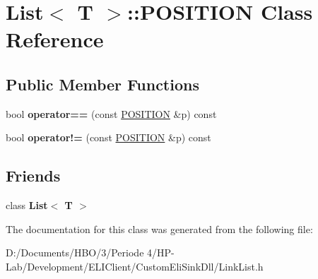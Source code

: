 \hypertarget{class_list_1_1_p_o_s_i_t_i_o_n}{}\section{List$<$ T $>$\+:\+:P\+O\+S\+I\+T\+I\+ON Class Reference}
\label{class_list_1_1_p_o_s_i_t_i_o_n}
\subsection*{Public Member Functions}
\begin{DoxyCompactItemize}
\item 
\mbox{\label{class_list_1_1_p_o_s_i_t_i_o_n_ae608807944df946755eddd1c80a6239b}} 
bool {\bfseries operator==} (const \hyperlink{class_list_1_1_p_o_s_i_t_i_o_n}{P\+O\+S\+I\+T\+I\+ON} \&p) const
\item 
\mbox{\label{class_list_1_1_p_o_s_i_t_i_o_n_a6264eecd231ffe36d8289bcc891cbc15}} 
bool {\bfseries operator!=} (const \hyperlink{class_list_1_1_p_o_s_i_t_i_o_n}{P\+O\+S\+I\+T\+I\+ON} \&p) const
\end{DoxyCompactItemize}
\subsection*{Friends}
\begin{DoxyCompactItemize}
\item 
\mbox{\label{class_list_1_1_p_o_s_i_t_i_o_n_adfa51a0eca1eba953f68ca3f65cdaa05}} 
class {\bfseries List$<$ T $>$}
\end{DoxyCompactItemize}


The documentation for this class was generated from the following file\+:\begin{DoxyCompactItemize}
\item 
D\+:/\+Documents/\+H\+B\+O/3/\+Periode 4/\+H\+P-\/\+Lab/\+Development/\+E\+L\+I\+Client/\+Custom\+Eli\+Sink\+Dll/Link\+List.\+h\end{DoxyCompactItemize}
